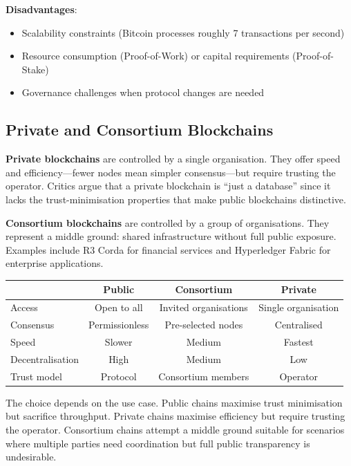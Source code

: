 \documentclass[11pt,a4paper]{article}
\newcommand{\keyword}[1]{\textbf{\textcolor{AccentOrange}{#1}}}
\begin{document}
\textbf{Disadvantages}:
\begin{itemize}
    \item Scalability constraints (Bitcoin processes roughly 7 transactions per second)
    \item Resource consumption (Proof-of-Work) or capital requirements (Proof-of-Stake)
    \item Governance challenges when protocol changes are needed
\end{itemize}

\subsection{Private and Consortium Blockchains}

\keyword{Private blockchains} are controlled by a single organisation. They offer speed and efficiency---fewer nodes mean simpler consensus---but require trusting the operator. Critics argue that a private blockchain is ``just a database'' since it lacks the trust-minimisation properties that make public blockchains distinctive.

\keyword{Consortium blockchains} are controlled by a group of organisations. They represent a middle ground: shared infrastructure without full public exposure. Examples include R3 Corda for financial services and Hyperledger Fabric for enterprise applications.

\begin{center}
\begin{tabular}{lccc}
\toprule
& \textbf{Public} & \textbf{Consortium} & \textbf{Private} \\
\midrule
Access & Open to all & Invited organisations & Single organisation \\
Consensus & Permissionless & Pre-selected nodes & Centralised \\
Speed & Slower & Medium & Fastest \\
Decentralisation & High & Medium & Low \\
Trust model & Protocol & Consortium members & Operator \\
\bottomrule
\end{tabular}
\end{center}

The choice depends on the use case. Public chains maximise trust minimisation but sacrifice throughput. Private chains maximise efficiency but require trusting the operator. Consortium chains attempt a middle ground suitable for scenarios where multiple parties need coordination but full public transparency is undesirable.
\end{document}
